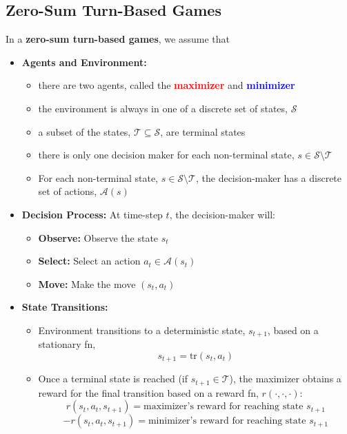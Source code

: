 \subsection{Zero-Sum Turn-Based Games}
\begin{summary}
    In a \textbf{zero-sum turn-based games}, we assume that 
    \begin{itemize}
        \item \textbf{Agents and Environment:} 
        \begin{itemize}
            \item there are two agents, called the \textcolor{red}{\textbf{maximizer}} and \textcolor{blue}{\textbf{minimizer}}
            \item the environment is always in one of a discrete set of states, $\mathcal{S}$
            \item a subset of the states, $\mathcal{T} \subseteq \mathcal{S}$, are terminal states
            \item there is only one decision maker for each non-terminal state, $s \in \mathcal{S} \setminus \mathcal{T}$
            \item For each non-terminal state, $s \in \mathcal{S} \setminus \mathcal{T}$, the decision-maker has a discrete set of actions, $\mathcal{A}(s)$
        \end{itemize}
        \item \textbf{Decision Process:} At time-step $t$, the decision-maker will: 
        \begin{itemize}
            \item \textbf{Observe:} Observe the state $s_t$ 
            \item \textbf{Select:} Select an action $a_t \in \mathcal{A}(s_t)$
            \item \textbf{Move:} Make the move $(s_t,a_t)$
        \end{itemize}
        \item \textbf{State Transitions:} 
        \begin{itemize}
            \item Environment transitions to a deterministic state, $s_{t+1}$, based on a stationary fn, 
            \begin{equation*}
                s_{t+1} = \text{tr}(s_t,a_t)
            \end{equation*}
            \item Once a terminal state is reached (if $s_{t+1} \in \mathcal{T}$), the maximizer obtains a reward for the final transition based on a reward fn, $r(\cdot,\cdot,\cdot)$:
            \begin{equation*}
                r(s_t,a_t,s_{t+1}) = \text{maximizer's reward for reaching state $s_{t+1}$}
            \end{equation*}
            \begin{equation*}
                - r(s_t,a_t,s_{t+1}) = \text{minimizer's reward for reaching state $s_{t+1}$}
            \end{equation*}
        \end{itemize}
    \end{itemize}
\end{summary}

